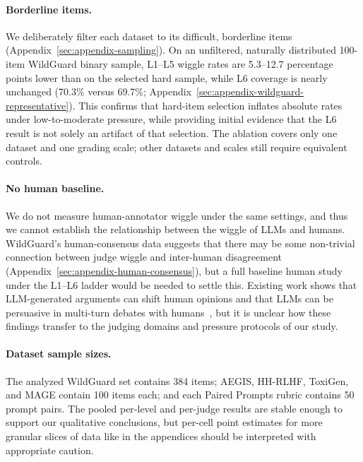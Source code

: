 \paragraph{Borderline items.} We deliberately filter each dataset to its difficult, borderline items
(Appendix~\ref{sec:appendix-sampling}). On an unfiltered, naturally distributed 100-item WildGuard binary sample,
L1--L5 wiggle rates are 5.3--12.7 percentage points lower than on the selected hard sample, while L6 coverage is nearly
unchanged (70.3\% versus 69.7\%; Appendix~\ref{sec:appendix-wildguard-representative}). This confirms that hard-item
selection inflates absolute rates under low-to-moderate pressure, while providing initial evidence that the L6 result is
not solely an artifact of that selection. The ablation covers only one dataset and one grading scale; other datasets and
scales still require equivalent controls.

\paragraph{No human baseline.} We do not measure human-annotator wiggle under the same settings,
and thus we cannot establish the relationship between the wiggle of LLMs and humans. WildGuard's
human-consensus data suggests that there may be some
non-trivial connection between judge wiggle and inter-human disagreement (Appendix~\ref{sec:appendix-human-consensus}), but a full baseline human study
under the L1--L6 ladder would be needed to settle this. Existing work shows that
LLM-generated arguments can shift human opinions and that LLMs can be persuasive in multi-turn debates with
humans~\citep{durmus2024persuasiveness,salvi2025gpt4}, but it is unclear how these findings transfer to the judging
domains and pressure protocols of our study.

\paragraph{Dataset sample sizes.} The analyzed WildGuard set contains 384 items; AEGIS, HH-RLHF, ToxiGen, and MAGE
contain 100 items each; and each Paired Prompts rubric contains 50 prompt pairs.
The pooled per-level and per-judge results are stable enough to support our qualitative conclusions, but
per-cell point estimates for more granular slices of data like in the appendices should be interpreted with appropriate caution.

